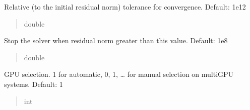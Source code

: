 \documentclass[letterpaper,10pt,english]{sphinxmanual}
\begin{document}
\begin{fulllineitems}
\begin{fulllineitems}
\begin{quote}
\begin{description}
\end{description}\end{quote}

\end{fulllineitems}


\begin{fulllineitems}
\label{\detokenize{_autosummary/nirfasterff.utils.SolverOptions:nirfasterff.utils.SolverOptions.RelativeTolerance}}
\pysigstartsignatures
{}
\pysigstopsignatures
\sphinxAtStartPar
Relative (to the initial residual norm) tolerance for convergence. Default: 1e\sphinxhyphen{}12
\begin{quote}\begin{description}
\sphinxAtStartPar
double

\end{description}\end{quote}

\end{fulllineitems}


\begin{fulllineitems}
\label{\detokenize{_autosummary/nirfasterff.utils.SolverOptions:nirfasterff.utils.SolverOptions.divergence}}
\pysigstartsignatures
{}
\pysigstopsignatures
\sphinxAtStartPar
Stop the solver when residual norm greater than this value. Default: 1e8
\begin{quote}\begin{description}
\sphinxAtStartPar
double

\end{description}\end{quote}

\end{fulllineitems}


\begin{fulllineitems}
\label{\detokenize{_autosummary/nirfasterff.utils.SolverOptions:nirfasterff.utils.SolverOptions.GPU}}
\pysigstartsignatures
{}
\pysigstopsignatures
\sphinxAtStartPar
GPU selection. \sphinxhyphen{}1 for automatic, 0, 1, … for manual selection on multi\sphinxhyphen{}GPU systems. Default: \sphinxhyphen{}1
\begin{quote}\begin{description}
\sphinxAtStartPar
int


\end{description}
\end{quote}
\end{fulllineitems}
\end{fulllineitems}
\end{document}
